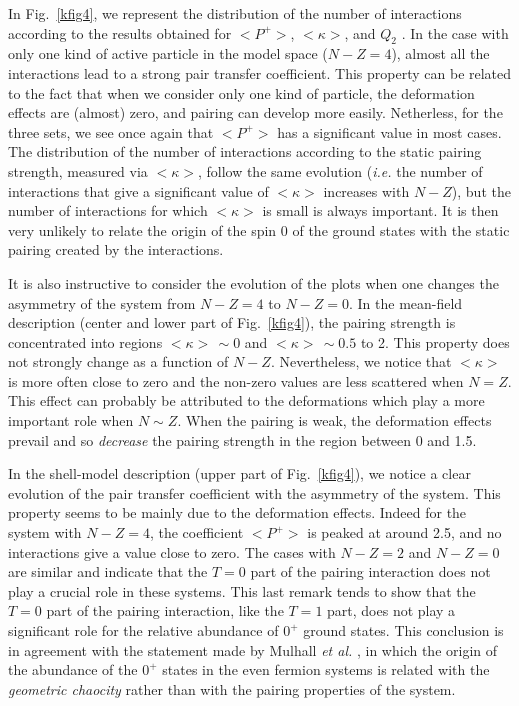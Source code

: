 \documentclass[rmp,aps,floatfix]{revtex4}
\begin{document}
In Fig.~\ref{kfig4}, we represent the distribution of the number
of interactions according to the results obtained for $<\!P^+\!>$,
$<\!\kappa\!>$,
and $Q_2$ \cite{ben02}. 
In the case with only one kind of active particle in the model
space ($N-Z=4$), almost all the interactions lead to a strong
pair transfer coefficient. This property can be related to the fact
that when we consider only one kind of particle, the deformation effects
are (almost) zero, and pairing can develop more easily. Netherless, for the
three sets, we see once again that $<\!P^+\!>$ has a significant value
in most cases.  The distribution of the number of 
interactions according to the
static pairing strength, measured via $<\!\kappa\!>$, follow the same
evolution ({\it i.e.} the number of interactions that give a significant
value of $<\!\kappa\!>$ increases with $N-Z$), but the number of interactions
for which $<\!\kappa\!>$ is small is always important. It is then very
unlikely to relate the origin of the spin 0 of the ground states with the
static pairing created by the interactions.




It is also instructive to consider the evolution of the plots when
one changes the asymmetry of the system from $N-Z=4$ to $N-Z=0$.
In the mean-field description (center and lower
part of Fig.~\ref{kfig4}), the pairing strength is concentrated
into regions $<\!\kappa\!>\,\sim 0$ and
$<\!\kappa\!>\,\sim 0.5$ to 2. This property
does not strongly change as a function of $N-Z$. Nevertheless, we notice
that $<\!\kappa\!>$ is more often close to zero and the non-zero values are
less scattered when $N=Z$. This effect can probably be attributed to
the deformations which play a more important role when $N\sim Z$.
When the pairing is weak, the deformation effects prevail and so
{\it decrease} the pairing strength in the region between 0 and 1.5.

In the shell-model description (upper
part of Fig.~\ref{kfig4}), we notice a clear evolution of the pair transfer
coefficient with the asymmetry of the system. This property seems to be
mainly due to the deformation effects. Indeed for the system with $N-Z=4$,
the coefficient $<\!P^+\!>$ is peaked at around 2.5, and no interactions
give a value close to zero. The cases with $N-Z=2$ and $N-Z=0$ are similar
and indicate that the $T=0$ part of the pairing
interaction does not play a crucial role in these systems.
This last remark tends to show that the $T=0$ part of the pairing interaction,
like the $T=1$ part, 
does not play a significant role for the relative abundance
of $0^+$ ground states. This conclusion is in agreement with the statement
made by Mulhall {\it et al.} \cite{mulhall00}, in which the origin of the
abundance of the $0^+$ states in the even fermion systems is related with
the {\it geometric chaocity} rather than with the pairing properties of the
system.
\end{document}
